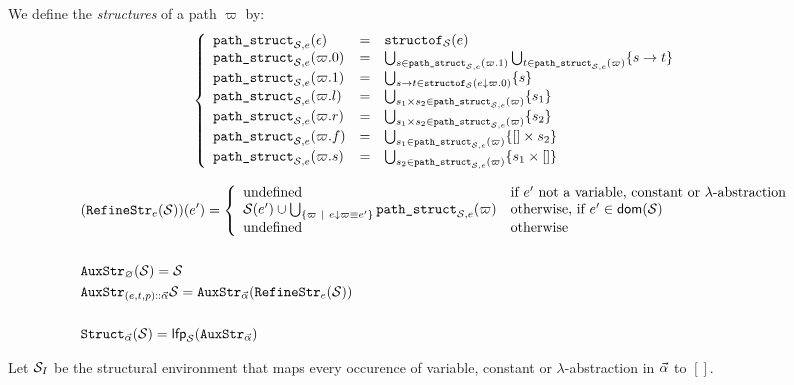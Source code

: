 \documentclass[a4paper]{article}
\theoremstyle{definition}
\begin{document}
    We define the \textit{structures} of a path $\varpi$ by:
    \[
      \left\{
        \begin{array}{lcl}
          \texttt{path\_struct}_{\mathcal{S},e}(\epsilon) & = & \texttt{structof}_{\mathcal{S}}(e) \\
          \texttt{path\_struct}_{\mathcal{S},e}(\varpi.0) & = & \bigcup_{s\in\texttt{path\_struct}_{\mathcal{S},e}(\varpi.1)} \bigcup_{t\in\texttt{path\_struct}_{\mathcal{S},e}(\varpi)} \{s\to t\} \\
          \texttt{path\_struct}_{\mathcal{S},e}(\varpi.1) & = & \bigcup_{s\to t\in\texttt{structof}_{\mathcal{S}}(e{\downarrow}\varpi.0)} \{s\}\\
          \texttt{path\_struct}_{\mathcal{S},e}(\varpi.l) & = & \bigcup_{s_1\times s_2\in\texttt{path\_struct}_{\mathcal{S},e}(\varpi)} \{s_1\} \\
          \texttt{path\_struct}_{\mathcal{S},e}(\varpi.r) & = & \bigcup_{s_1\times s_2\in\texttt{path\_struct}_{\mathcal{S},e}(\varpi)} \{s_2\} \\
          \texttt{path\_struct}_{\mathcal{S},e}(\varpi.f) & = & \bigcup_{s_1\in\texttt{path\_struct}_{\mathcal{S},e}(\varpi)} \{{[}]\times s_2\} \\
          \texttt{path\_struct}_{\mathcal{S},e}(\varpi.s) & = & \bigcup_{s_2\in\texttt{path\_struct}_{\mathcal{S},e}(\varpi)} \{s_1\times {[}]\}
        \end{array}  
      \right.
    \]

    \begin{align*}
      &(\texttt{RefineStr}_{e}(\mathcal{S}))(e') = 
        \left\{\begin{array}{ll}
          \text{undefined} & \text{if } e' \text{ not a variable, constant or $\lambda$-abstraction}\\
          \mathcal{S}(e') \cup \bigcup_{\{\varpi ~|~ e{\downarrow}\varpi \equiv e'\}} \texttt{path\_struct}_{\mathcal{S},e}(\varpi) & \text{otherwise, if } e' \in \textsf{dom}(\mathcal{S})\\
          \text{undefined} & \text{otherwise}
        \end{array}\right.\\&\\
      &\texttt{AuxStr}_{\varnothing} (\mathcal{S}) = \mathcal{S}\\
      &\texttt{AuxStr}_{{(e,t,p)}\textsf{::}{\vec \alpha}} \mathcal{S} = \texttt{AuxStr}_{\vec \alpha} (\texttt{RefineStr}_{e}(\mathcal{S}))\\&\\
      &\texttt{Struct}_{\vec \alpha}(\mathcal{S})=\textsf{lfp}_{\mathcal{S}} (\texttt{AuxStr}_{\vec \alpha})
    \end{align*}

    Let $\mathcal{S}_I$ be the structural environment that maps every occurence of variable, constant or $\lambda$-abstraction
    in $\vec \alpha$ to $[]$.
\end{document}
